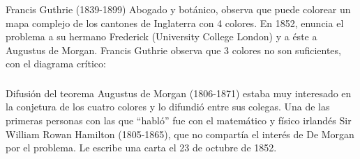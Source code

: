 \documentclass[spanish, utf8,handout]{beamer} %
\theoremstyle{definition}
\begin{document}
\begin{frame}\transblindsvertical
\frametitle{\insertsubsection}

\begin{exampleblock}{Francis Guthrie (1839-1899)}
Abogado y botánico, observa que puede colorear un mapa complejo de los cantones de Inglaterra con 4 colores. En 1852, enuncia el problema a su hermano Frederick (University College London) y a éste a Augustus de Morgan. Francis Guthrie observa que 3 colores no son suficientes, con el diagrama crítico:
\end{exampleblock}
\end{frame}

\begin{frame}\transblindsvertical
\frametitle{\insertsection}

\begin{alertblock}{Difusión del teorema}
Augustus de Morgan (1806-1871) estaba muy interesado en la conjetura de los cuatro colores y lo difundió entre sus colegas. Una de las primeras personas con las que ``habló'' fue con el matemático y físico irlandés Sir William Rowan Hamilton (1805-1865), que no compartía el interés de De Morgan por el problema. Le escribe una carta el 23 de octubre de 1852.
\end{alertblock}

\end{frame}
\end{document}
